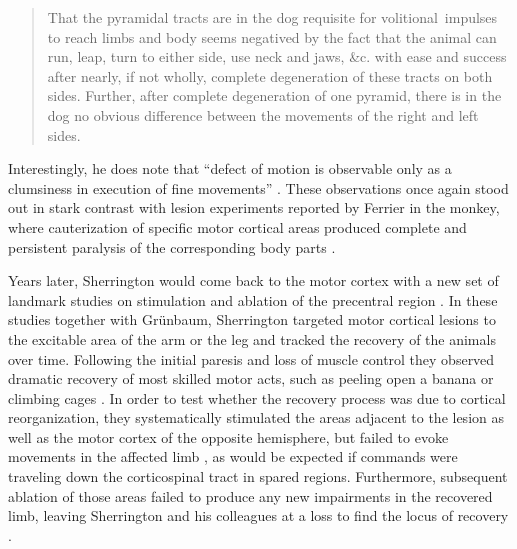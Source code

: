 \blockquote[{\protect\cite[p.189]{Sherrington1885}}]{That the pyramidal tracts are in the dog requisite for volitional~impulses to reach limbs and body seems negatived by the fact that the animal can run, leap, turn to either side, use neck and jaws, \&c. with ease and success after nearly, if not wholly, complete degeneration of these tracts on both sides. Further, after complete degeneration of one pyramid, there is in the dog no obvious difference between the movements of the right and left sides.}

Interestingly, he does note that \enquote{defect of motion is observable only as a clumsiness in execution of fine movements} \cite{Sherrington1885}. These observations once again stood out in stark contrast with lesion experiments reported by Ferrier in the monkey, where cauterization of specific motor cortical areas produced complete and persistent paralysis of the corresponding body parts \cite{Ferrier1884}.

Years later, Sherrington would come back to the motor cortex with a new set of landmark studies on stimulation and ablation of the precentral region \cite{Grunbaum1903,GrahamBrown1913,Leyton1917}. In these studies together with Gr\"unbaum, Sherrington targeted motor cortical lesions to the excitable area of the arm or the leg and tracked the recovery of the animals over time. Following the initial paresis and loss of muscle control they observed dramatic recovery of most skilled motor acts, such as peeling open a banana or climbing cages \cite{Leyton1917}. In order to test whether the recovery process was due to cortical reorganization, they systematically stimulated the areas adjacent to the lesion as well as the motor cortex of the opposite hemisphere, but failed to evoke movements in the affected limb \cite{Leyton1917}, as would be expected if commands were traveling down the corticospinal tract in spared regions. Furthermore, subsequent ablation of those areas failed to produce any new impairments in the recovered limb, leaving Sherrington and his colleagues at a loss to find the locus of recovery \cite{Leyton1917}.

